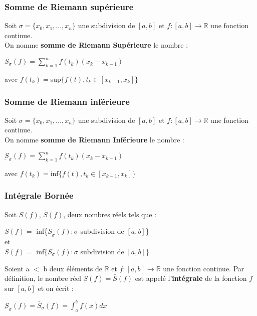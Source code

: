 \documentclass[12pt, a4paper]{book}
\begin{document}
\subsubsection{Somme de Riemann supérieure}
Soit $\sigma = \{x_0, x_1, ... ,x_n\}$ une subdivision de $[a,b]$ et $f:[a,b] \rightarrow \mathbb{R}$ une fonction continue.\\
On nomme \textbf{somme de Riemann Supérieure} le nombre :
\begin{center}
    $\bar{S}_{\sigma}(f)=  \sum_{k=1}^{n} f(t_k)(x_k-x_{k-1})$
\end{center}
avec  $f(t_k) = $sup$ \{f(t), t_k \in [x_{k - 1}, x_k] \}$

\subsubsection{Somme de Riemann inférieure}
Soit $\sigma = \{x_0, x_1, ... ,x_n\}$ une subdivision de $[a,b]$ et $f:[a,b] \rightarrow \mathbb{R}$ une fonction continue.\\
On nomme \textbf{somme de Riemann Inférieure} le nombre :
\begin{center}
    $\underbar{S}_{\sigma}(f)=  \sum_{k=1}^{n} f(t_k)(x_k-x_{k-1})$
\end{center}
avec  $f(t_k) = $inf$ \{f(t), t_k \in [x_{k - 1}, x_k] \}$

\subsubsection{Intégrale Bornée}
Soit $\underbar{S}(f)$, $\bar{S}(f)$, deux nombres réels tels que :\\
\begin{center}
    $\underbar{S}(f)=$ inf\{$\underbar{S}_{\sigma}(f) : \sigma$ subdivision de $[a,b]$\}\\
    et\\
    $\bar{S}(f)=$ inf\{$\bar{S}_{\sigma}(f) : \sigma$ subdivision de $[a,b]$\}
\end{center}
Soient a $<$ b deux éléments de $\mathbb{R}$ et $f:[a,b]\rightarrow \mathbb{R}$ une fonction continue. Par définition, le nombre réel $\underbar{S}(f)=\bar{S}(f)$ est
appelé l'\textbf{intégrale} de la fonction $f$ sur $[a,b]$ et on écrit :
\begin{center}
    $\underbar{S}_{\sigma}(f)=\bar{S}_{\sigma}(f) = \int_{a}^{b} f(x) dx $
\end{center}
\end{document}
